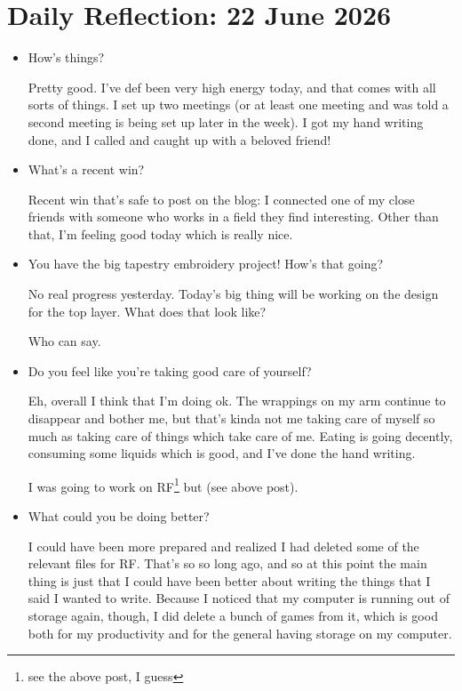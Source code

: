 \documentclass[12pt]{article}
\renewcommand{\,}{\textsuperscript{,}}
\begin{document}
\section{Daily Reflection: 22 June 2026}  
\begin{itemize}  
\item How's things?

Pretty good. I've def been very high energy today, and that comes with all sorts of things. I set up two meetings (or at least one meeting and was told a second meeting is being set up later in the week). I got my hand writing done, and I called and caught up with a beloved friend!

\item What's a recent win?

Recent win that's safe to post on the blog: I connected one of my close friends with someone who works in a field they find interesting.  
Other than that, I'm feeling good today which is really nice.

\item You have the big tapestry embroidery project! How's that going?

No real progress yesterday. Today's big thing will be working on the design for the top layer.  
What does that look like?

Who can say.

\item Do you feel like you're taking good care of yourself?

Eh, overall I think that I'm doing ok. The wrappings on my arm continue to disappear and bother me, but that's kinda not me taking care of myself so much as taking care of things which take care of me.  
Eating is going decently, consuming some liquids which is good, and I've done the hand writing.

I was going to work on RF\footnote{see the above post, I guess} but (see above post).

\item What could you be doing better?

I could have been more prepared and realized I had deleted some of the relevant files for RF.  
That's so so long ago, and so at this point the main thing is just that I could have been better about writing the things that I said I wanted to write.  
Because I noticed that my computer is running out of storage again, though, I did delete a bunch of games from it, which is good both for my productivity and for the general having storage on my computer.


\end{itemize}
\end{document}
